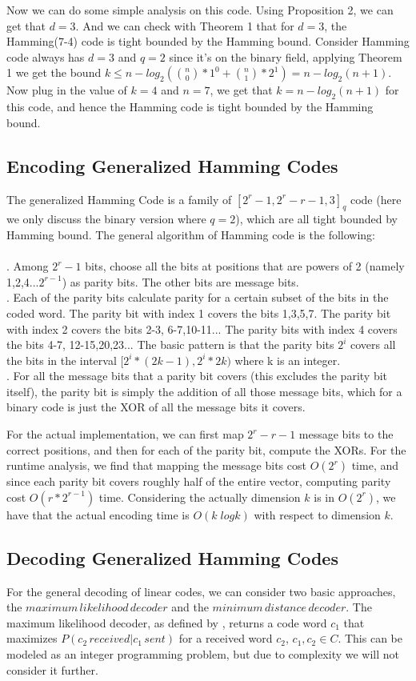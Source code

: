 \documentclass{article}
\begin{document}
Now we can do some simple analysis on this code. Using Proposition 2, we can get that $d = 3$. And we can check with Theorem 1 that for $d=3$, the Hamming(7-4) code is tight bounded by the Hamming bound. Consider Hamming code always has $d=3$ and $q=2$ since it's on the binary field, applying Theorem 1 we get the bound $k \le n-log_2({n\choose 0}*1^0 + {n\choose 1}*2^1) = n-log_2(n+1)$. Now plug in the value of $k=4$ and $n = 7$, we get that $k = n-log_2(n+1)$ for this code, and hence the Hamming code is tight bounded by the Hamming bound.

\subsection{Encoding Generalized Hamming Codes}
The generalized Hamming Code is a family of $[2^r-1, 2^r-r-1,3]_q$ code (here we only discuss the binary version where $q=2$), which are all tight bounded by Hamming bound. The general algorithm of Hamming code is the following:\\\\
. \quad Among $2^r-1$ bits, choose all the bits at positions that are powers of 2 (namely 1,2,4...$2^{r-1}$) as parity bits. The other bits are message bits.\\
. \quad Each of the parity bits calculate parity for a certain subset of the bits in the coded word. The parity bit with index 1 covers the bits 1,3,5,7. The parity bit with index 2 covers the bits 2-3, 6-7,10-11... The parity bits with index 4 covers the bits 4-7, 12-15,20,23... The basic pattern is that the parity bits $2^i$ covers all the bits in the interval $[2^i*(2k-1), 2^i*2k )$ where k is an integer.\\
. \quad For all the message bits that a parity bit covers (this excludes the parity bit itself), the parity bit is simply the addition of all those message bits, which for a binary code is just the XOR of all the message bits it covers. 

For the actual implementation, we can first map $2^r-r-1$ message bits to the correct positions, and then for each of the parity bit, compute the XORs. For the runtime analysis, we find that mapping the message bits cost $O(2^r)$ time, and since each parity bit covers roughly half of the entire vector, computing parity cost $O(r*2^{r-1})$ time. Considering the actually dimension $k$ is in $O(2^r)$, we have that the actual encoding time is $O(k \;logk)$ with respect to dimension $k$.
\subsection{Decoding Generalized Hamming Codes}
For the general decoding of linear codes, we can consider two basic approaches, the $maximum\, likelihood\, decoder$ and the $minimum\, distance\, decoder$. The maximum likelihood decoder, as defined by \cite{decoder_citation}, returns a code word $c_1$ that maximizes $P( c_2\, received | c_1\, sent)$ for a received word $c_2$, $c_1, c_2 \in C$. This can be modeled as an integer programming problem, but due to complexity we will not consider it further. 
\end{document}
